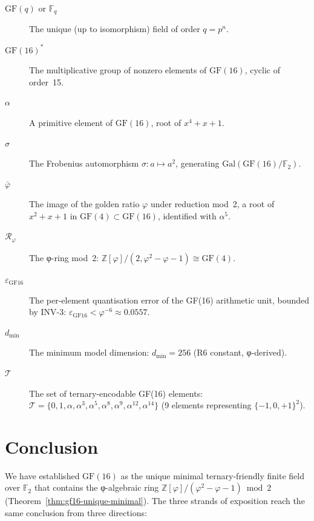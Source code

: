 \begin{description}
  \item[\(\mathrm{GF}(q)\) or \(\mathbb{F}_q\)]
    The unique (up to isomorphism) field of order \(q=p^n\).
  \item[\(\mathrm{GF}(16)^*\)]
    The multiplicative group of nonzero elements of \(\mathrm{GF}(16)\),
    cyclic of order~15.
  \item[\(\alpha\)]
    A primitive element of \(\mathrm{GF}(16)\), root of \(x^4+x+1\).
  \item[\(\sigma\)]
    The Frobenius automorphism \(\sigma\colon a\mapsto a^2\),
    generating \(\mathrm{Gal}(\mathrm{GF}(16)/\mathbb{F}_2)\).
  \item[\(\bar\varphi\)]
    The image of the golden ratio \(\varphi\) under reduction mod~2,
    a root of \(x^2+x+1\) in \(\mathrm{GF}(4)\subset\mathrm{GF}(16)\),
    identified with \(\alpha^5\).
  \item[\(\mathcal{R}_\varphi\)]
    The φ-ring mod~2: \(\mathbb{Z}[\varphi]/(2,\varphi^2-\varphi-1)\cong\mathrm{GF}(4)\).
  \item[\(\varepsilon_{\mathrm{GF16}}\)]
    The per-element quantisation error of the GF(16) arithmetic unit,
    bounded by INV-3: \(\varepsilon_{\mathrm{GF16}}<\varphi^{-6}\approx 0.0557\).
  \item[\(d_{\min}\)]
    The minimum model dimension: \(d_{\min}=256\) (R6 constant, φ-derived).
  \item[\(\mathcal{T}\)]
    The set of ternary-encodable GF(16) elements:
    \(\mathcal{T}=\{0,1,\alpha,\alpha^3,\alpha^5,\alpha^8,\alpha^9,\alpha^{12},\alpha^{14}\}\)
    (9 elements representing \(\{-1,0,+1\}^2\)).
\end{description}

\section{Conclusion}
\label{sec:gf16-conclusion}

We have established \(\mathrm{GF}(16)\) as the unique minimal
ternary-friendly finite field over \(\mathbb{F}_2\) that contains
the φ-algebraic ring \(\mathbb{Z}[\varphi]/(\varphi^2-\varphi-1)\bmod 2\)
(Theorem~\ref{thm:gf16-unique-minimal}).
The three strands of exposition reach the same conclusion from
three directions:

